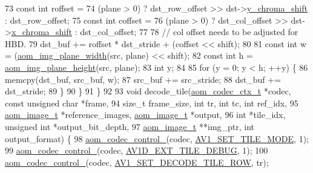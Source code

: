 \begin{DoxyCodeInclude}
{73     \textcolor{keyword}{const} \textcolor{keywordtype}{int} roffset =
74         (plane > 0) ? dst\_row\_offset >> dst->\hyperlink{structaom__image_a5acfc850c272e1377f3b7d58a95f3749}{y\_chroma\_shift} : dst\_row\_offset;
75     \textcolor{keyword}{const} \textcolor{keywordtype}{int} coffset =
76         (plane > 0) ? dst\_col\_offset >> dst->\hyperlink{structaom__image_a83fdb3677275dc0e1e38701000447214}{x\_chroma\_shift} : dst\_col\_offset;
77 
78     \textcolor{comment}{// col offset needs to be adjusted for HBD.}
79     dst\_buf += roffset * dst\_stride + (coffset << shift);
80 
81     \textcolor{keyword}{const} \textcolor{keywordtype}{int} w = (\hyperlink{aom__image_8h_adfb2ea2e110ee42e38370868b64bf232}{aom\_img\_plane\_width}(src, plane) << shift);
82     \textcolor{keyword}{const} \textcolor{keywordtype}{int} h = \hyperlink{aom__image_8h_ab87684a93e3da97bd6223d1e46876848}{aom\_img\_plane\_height}(src, plane);
83     \textcolor{keywordtype}{int} y;
84 
85     \textcolor{keywordflow}{for} (y = 0; y < h; ++y) \{
86       memcpy(dst\_buf, src\_buf, w);
87       src\_buf += src\_stride;
88       dst\_buf += dst\_stride;
89     \}
90   \}
91 \}
92 
93 \textcolor{keywordtype}{void} decode\_tile(\hyperlink{structaom__codec__ctx}{aom\_codec\_ctx\_t} *codec, \textcolor{keyword}{const} \textcolor{keywordtype}{unsigned} \textcolor{keywordtype}{char} *frame,
94                  \textcolor{keywordtype}{size\_t} frame\_size, \textcolor{keywordtype}{int} tr, \textcolor{keywordtype}{int} tc, \textcolor{keywordtype}{int} ref\_idx,
95                  \hyperlink{structaom__image}{aom\_image\_t} *reference\_images, \hyperlink{structaom__image}{aom\_image\_t} *output,
96                  \textcolor{keywordtype}{int} *tile\_idx, \textcolor{keywordtype}{unsigned} \textcolor{keywordtype}{int} *output\_bit\_depth,
97                  \hyperlink{structaom__image}{aom\_image\_t} **img\_ptr, \textcolor{keywordtype}{int} output\_format) \{
98   \hyperlink{group__codec_ga51eb332a40dcacc39000ab8e0be36b79}{aom\_codec\_control\_}(codec, \hyperlink{group__aom__decoder_gga3865fd4b3192489baa9a5c3632ebe97ba0795d8084ae8c78528c01587198df9e2}{AV1\_SET\_TILE\_MODE}, 1);
99   \hyperlink{group__codec_ga51eb332a40dcacc39000ab8e0be36b79}{aom\_codec\_control\_}(codec, \hyperlink{group__aom__decoder_gga3865fd4b3192489baa9a5c3632ebe97baffdaca91296725bd16142a33f3cc6522}{AV1D\_EXT\_TILE\_DEBUG}, 1);
100   \hyperlink{group__codec_ga51eb332a40dcacc39000ab8e0be36b79}{aom\_codec\_control\_}(codec, \hyperlink{group__aom__decoder_gga3865fd4b3192489baa9a5c3632ebe97bac056b4cf80427fd05e3c4c9fc46edb78}{AV1\_SET\_DECODE\_TILE\_ROW}, tr);
}
\end{DoxyCodeInclude}

